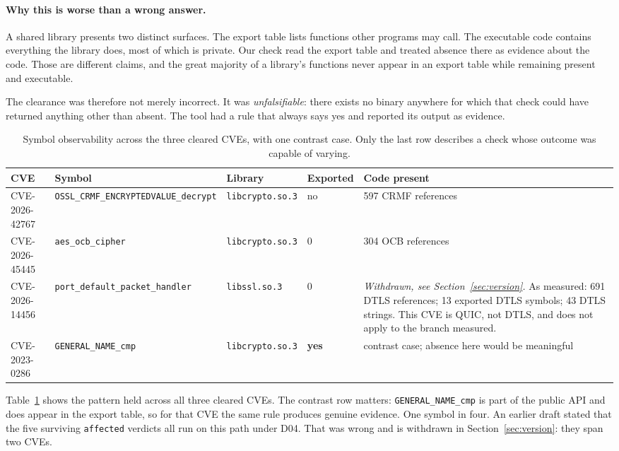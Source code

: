 \paragraph{Why this is worse than a wrong answer.} A shared library presents two
distinct surfaces. The export table lists functions other programs may call. The
executable code contains everything the library does, most of which is private.
Our check read the export table and treated absence there as evidence about the
code. Those are different claims, and the great majority of a library's functions
never appear in an export table while remaining present and executable.

The clearance was therefore not merely incorrect. It was \emph{unfalsifiable}:
there exists no binary anywhere for which that check could have returned anything
other than absent. The tool had a rule that always says yes and reported its
output as evidence.

\begin{table}[t]
\caption{Symbol observability across the three cleared CVEs, with one contrast
case. Only the last row describes a check whose outcome was capable of varying.}
\label{tab:symbols}
\centering
\footnotesize
\setlength{\tabcolsep}{4pt}
\begin{tabular}{@{}llllp{4.4cm}@{}}
\toprule
CVE & Symbol & Library & Exported & Code present \\
\midrule
CVE-2026-42767 & \texttt{OSSL\_CRMF\_ENCRYPTEDVALUE\_decrypt} & \texttt{libcrypto.so.3} & no & 597 CRMF references \\
CVE-2026-45445 & \texttt{aes\_ocb\_cipher} & \texttt{libcrypto.so.3} & 0 & 304 OCB references \\
CVE-2026-14456 & \texttt{port\_default\_packet\_handler} & \texttt{libssl.so.3} & 0 & \emph{Withdrawn, see Section~\ref{sec:version}.} As measured: 691 DTLS references; 13 exported DTLS symbols; 43 DTLS strings. This CVE is QUIC, not DTLS, and does not apply to the branch measured. \\
CVE-2023-0286 & \texttt{GENERAL\_NAME\_cmp} & \texttt{libcrypto.so.3} & \textbf{yes} & contrast case; absence here would be meaningful \\
\bottomrule
\end{tabular}
\end{table}

Table~\ref{tab:symbols} shows the pattern held across all three cleared CVEs. The
contrast row matters: \texttt{GENERAL\_NAME\_cmp} is part of the public API and
does appear in the export table, so for that CVE the same rule produces genuine
evidence. One symbol in four. An earlier draft stated that the five surviving
\texttt{affected} verdicts all run on this path under D04. That was wrong and is
withdrawn in Section~\ref{sec:version}: they span two CVEs.

